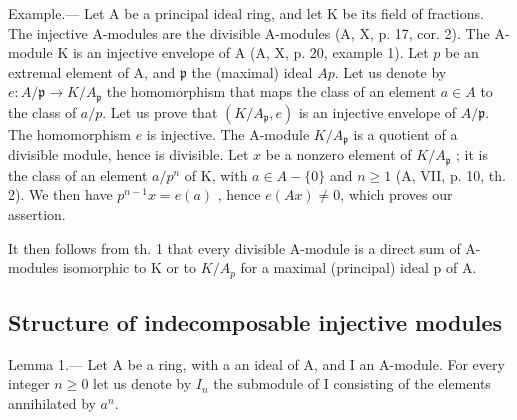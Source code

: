 Example.--- Let A be a principal ideal ring, and let K be its field of fractions. The injective A-modules are the divisible A-modules (A, X, p. 17, cor. 2). The A-module K is an injective envelope of A (A, X, p. 20, example 1). Let \(p\) be an extremal element of A, and \(\mathfrak{p}\) the (maximal) ideal \(Ap\). Let us denote by \(e: A/\mathfrak{p} \longrightarrow K/A_{\mathfrak{p}}\) the homomorphism that maps the class of an element \(a \in A\) to the class of \(a/p\). Let us prove that \((K/A_{\mathfrak{p}}, e)\) is an injective envelope of \(A/\mathfrak{p}\). The homomorphism \(e\) is injective. The A-module \(K/A_{\mathfrak{p}}\) is a quotient of a divisible module, hence is divisible. Let \(x\) be a nonzero element of \(K/A_{\mathfrak{p}}\) ; it is the class of an element \(a/p^n\) of K, with \(a \in A - \{0\}\) and \(n \geqslant 1\) (A, VII, p. 10, th. 2). We then have \(p^{n-1}x = e(a)\) , hence \(e(Ax) \neq 0\), which proves our assertion.

It then follows from th. 1 that every divisible A-module is a direct sum of A-modules isomorphic to K or to \(K/A_{p}\) for a maximal (principal) ideal p of A.

\subsection{Structure of indecomposable injective modules}

Lemma 1.--- Let A be a ring, with a an ideal of A, and I an A-module. For every integer \(n \geqslant 0\) let us denote by \(I_{n}\) the submodule of I consisting of the elements annihilated by \(a^{n}\).

